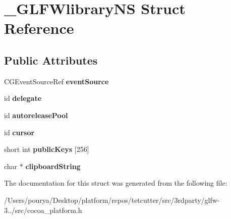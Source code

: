 \hypertarget{struct__GLFWlibraryNS}{}\section{\+\_\+\+G\+L\+F\+Wlibrary\+N\+S Struct Reference}
\label{struct__GLFWlibraryNS}
\subsection*{Public Attributes}
\begin{DoxyCompactItemize}
\item 
\hypertarget{struct__GLFWlibraryNS_ae0297b6477cfe5406d6cad47791ff524}{}C\+G\+Event\+Source\+Ref {\bfseries event\+Source}\label{struct__GLFWlibraryNS_ae0297b6477cfe5406d6cad47791ff524}

\item 
\hypertarget{struct__GLFWlibraryNS_ac9bef9b96260dd26ad1a9e7287b4d812}{}id {\bfseries delegate}\label{struct__GLFWlibraryNS_ac9bef9b96260dd26ad1a9e7287b4d812}

\item 
\hypertarget{struct__GLFWlibraryNS_a965953ce1e52e3bba21cf68c19fd1450}{}id {\bfseries autorelease\+Pool}\label{struct__GLFWlibraryNS_a965953ce1e52e3bba21cf68c19fd1450}

\item 
\hypertarget{struct__GLFWlibraryNS_a8e43282c25befcd282550e766c385ca9}{}id {\bfseries cursor}\label{struct__GLFWlibraryNS_a8e43282c25befcd282550e766c385ca9}

\item 
\hypertarget{struct__GLFWlibraryNS_a8f62e44622e0790f1c378e3a3d24077a}{}short int {\bfseries public\+Keys} \mbox{[}256\mbox{]}\label{struct__GLFWlibraryNS_a8f62e44622e0790f1c378e3a3d24077a}

\item 
\hypertarget{struct__GLFWlibraryNS_a194b216799b8f6e02d5153ad53f9b4da}{}char $\ast$ {\bfseries clipboard\+String}\label{struct__GLFWlibraryNS_a194b216799b8f6e02d5153ad53f9b4da}

\end{DoxyCompactItemize}


The documentation for this struct was generated from the following file\+:\begin{DoxyCompactItemize}
\item 
/\+Users/pourya/\+Desktop/platform/repos/tetcutter/src/3rdparty/glfw-\/3../src/cocoa\+\_\+platform.\+h\end{DoxyCompactItemize}
